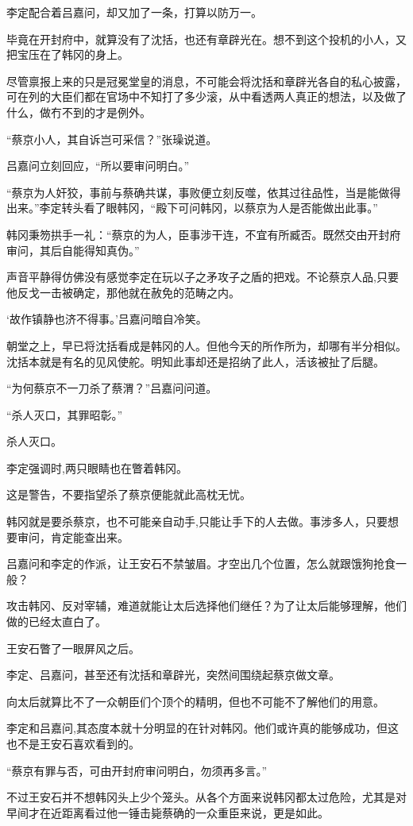 李定配合着吕嘉问，却又加了一条，打算以防万一。

毕竟在开封府中，就算没有了沈括，也还有章辟光在。想不到这个投机的小人，又把宝压在了韩冈的身上。

尽管禀报上来的只是冠冕堂皇的消息，不可能会将沈括和章辟光各自的私心披露，可在列的大臣们都在官场中不知打了多少滚，从中看透两人真正的想法，以及做了什么，做冇不到的才是例外。

“蔡京小人，其自诉岂可采信？”张璪说道。

吕嘉问立刻回应，“所以要审问明白。”

“蔡京为人奸狡，事前与蔡确共谋，事败便立刻反噬，依其过往品性，当是能做得出来。”李定转头看了眼韩冈，“殿下可问韩冈，以蔡京为人是否能做出此事。”

韩冈秉笏拱手一礼：“蔡京的为人，臣事涉干连，不宜有所臧否。既然交由开封府审问，其后自能得知真伪。”

声音平静得仿佛没有感觉李定在玩以子之矛攻子之盾的把戏。不论蔡京人品,只要他反戈一击被确定，那他就在赦免的范畴之内。

‘故作镇静也济不得事。’吕嘉问暗自冷笑。

朝堂之上，早已将沈括看成是韩冈的人。但他今天的所作所为，却哪有半分相似。沈括本就是有名的见风使舵。明知此事却还是招纳了此人，活该被扯了后腿。

“为何蔡京不一刀杀了蔡渭？”吕嘉问问道。

“杀人灭口，其罪昭彰。”

杀人灭口。

李定强调时,两只眼睛也在瞥着韩冈。

这是警告，不要指望杀了蔡京便能就此高枕无忧。

韩冈就是要杀蔡京，也不可能亲自动手,只能让手下的人去做。事涉多人，只要想要审问，肯定能查出来。

吕嘉问和李定的作派，让王安石不禁皱眉。才空出几个位置，怎么就跟饿狗抢食一般？

攻击韩冈、反对宰辅，难道就能让太后选择他们继任？为了让太后能够理解，他们做的已经太直白了。

王安石瞥了一眼屏风之后。

李定、吕嘉问，甚至还有沈括和章辟光，突然间围绕起蔡京做文章。

向太后就算比不了一众朝臣们个顶个的精明，但也不可能不了解他们的用意。

李定和吕嘉问,其态度本就十分明显的在针对韩冈。他们或许真的能够成功，但这也不是王安石喜欢看到的。

“蔡京有罪与否，可由开封府审问明白，勿须再多言。”

不过王安石并不想韩冈头上少个笼头。从各个方面来说韩冈都太过危险，尤其是对早间才在近距离看过他一锤击毙蔡确的一众重臣来说，更是如此。

